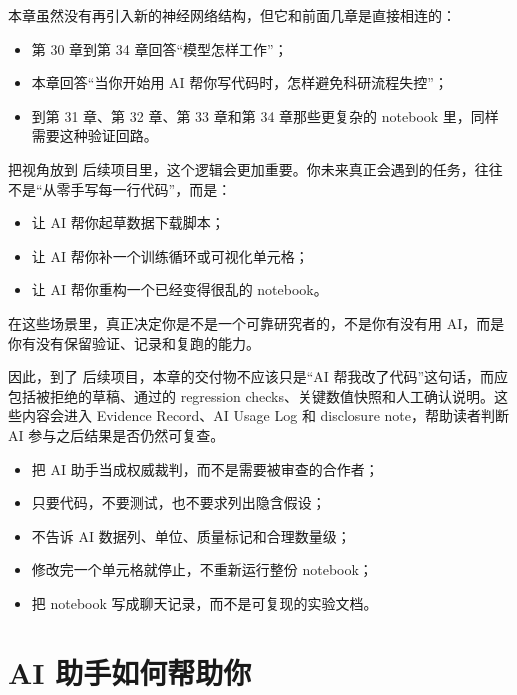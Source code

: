 本章虽然没有再引入新的神经网络结构，但它和前面几章是直接相连的：

\begin{itemize}
    \item 第 30 章到第 34 章回答“模型怎样工作”；
    \item 本章回答“当你开始用 AI 帮你写代码时，怎样避免科研流程失控”；
    \item 到第 31 章、第 32 章、第 33 章和第 34 章那些更复杂的 notebook 里，同样需要这种验证回路。
\end{itemize}

把视角放到 后续项目里，这个逻辑会更加重要。你未来真正会遇到的任务，往往不是“从零手写每一行代码”，而是：

\begin{itemize}
    \item 让 AI 帮你起草数据下载脚本；
    \item 让 AI 帮你补一个训练循环或可视化单元格；
    \item 让 AI 帮你重构一个已经变得很乱的 notebook。
\end{itemize}

在这些场景里，真正决定你是不是一个可靠研究者的，不是你有没有用 AI，而是你有没有保留验证、记录和复跑的能力。

因此，到了 后续项目，本章的交付物不应该只是“AI 帮我改了代码”这句话，而应包括被拒绝的草稿、通过的 regression checks、关键数值快照和人工确认说明。这些内容会进入 Evidence Record、AI Usage Log 和 disclosure note，帮助读者判断 AI 参与之后结果是否仍然可复查。

\begin{warnbox}
\begin{itemize}
    \item 把 AI 助手当成权威裁判，而不是需要被审查的合作者；
    \item 只要代码，不要测试，也不要求列出隐含假设；
    \item 不告诉 AI 数据列、单位、质量标记和合理数量级；
    \item 修改完一个单元格就停止，不重新运行整份 notebook；
    \item 把 notebook 写成聊天记录，而不是可复现的实验文档。
\end{itemize}
\end{warnbox}

\section{AI 助手如何帮助你}

